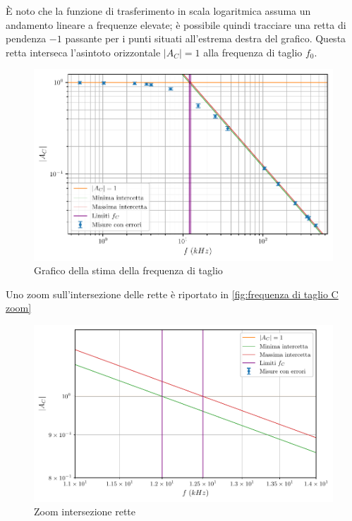 \documentclass[11pt, a4paper]{article}
\numberwithin{equation}{section} %
\begin{document}
È noto che la funzione di trasferimento in scala logaritmica assuma un andamento lineare a frequenze elevate; è possibile quindi tracciare una retta di pendenza $-1$ passante per i punti situati all'estrema destra del grafico. Questa retta interseca l'asintoto orizzontale $|A_{C}| = 1$ alla frequenza di taglio $f_{0}$.

\begin{figure}[ht!]
    \includegraphics{onda_sin_AC(f)_taglio.pdf}
    \caption{Grafico della stima della frequenza di taglio}
    \label{fig:frequenza di taglio C}
\end{figure}

Uno zoom sull'intersezione delle rette è riportato in \autoref{fig:frequenza di taglio C zoom}%

\begin{figure}[ht!]
    \includegraphics{onda_sin_AC(f)_taglio_frequenza.pdf}
    \caption{Zoom intersezione rette}
    \label{fig:frequenza di taglio C zoom}
\end{figure}
\end{document}
